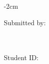 \begin{titlepage}
\begin{adjustwidth}{-2cm}{}
\vspace*{0.6cm}
\begin{flushleft}
Submitted by: \\
\vspace*{7pt}
\authorname\\
\address\\
\city\\
Student ID: \studentID\\




\end{flushleft}

\end{adjustwidth}

\end{titlepage}

\newpage


